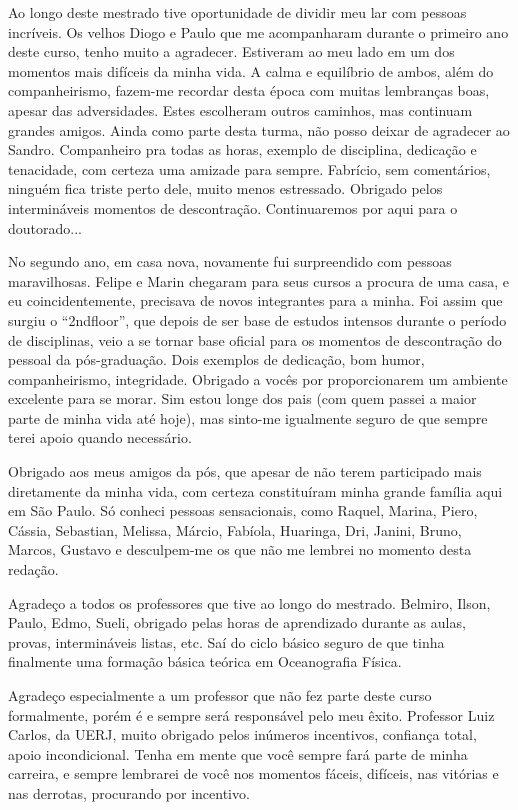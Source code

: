 Ao longo deste mestrado tive oportunidade de dividir meu lar com pessoas in\-crí\-veis. Os velhos Diogo e Paulo
que me acompanharam durante o primeiro ano deste curso, tenho muito a agradecer. Estiveram ao meu lado em
um dos momentos mais difíceis da minha vida. A calma e equilíbrio de ambos, além do companheirismo, fazem-me
recordar desta época com muitas lembranças boas, apesar das adversidades. Estes escolheram outros caminhos, mas 
continuam grandes amigos. Ainda como parte desta turma, não posso deixar de agradecer ao Sandro. Companheiro pra todas as horas,
exemplo de disciplina, dedicação e tenacidade, com certeza uma amizade para sempre. Fabrício, sem comentários, ninguém
fica triste perto dele, muito menos estressado. Obrigado pelos intermináveis momentos de descontração. 
Continuaremos por aqui para o doutorado... 
 
No segundo ano, em casa nova, novamente fui surpreendido com pessoas maravilhosas. Felipe e Marin chegaram
para seus cursos a procura de uma casa, e eu coincidentemente, precisava de novos integrantes para a minha. 
Foi assim que surgiu o ``2ndfloor'', que depois de ser base de estudos intensos durante o período de disciplinas, 
veio a se tornar base oficial para os momentos de descontração do pessoal da pós-graduação. 
Dois exemplos de dedicação, bom humor, companheirismo, integridade. Obrigado a vocês por proporcionarem
um ambiente excelente para se morar. Sim estou longe dos pais (com quem passei a maior parte de minha vida até hoje),  
mas sinto-me igualmente seguro de que sempre terei apoio quando necessário.

Obrigado aos meus amigos da pós, que 
apesar de não terem participado mais diretamente da minha vida, com certeza constituíram minha grande família
aqui em São Paulo. Só conheci pessoas sensacionais, como Raquel, Marina, Piero, Cássia, Sebastian, Melissa, Márcio, Fabíola, 
Huaringa, Dri, Janini, Bruno, Marcos, Gustavo e desculpem-me os que não me lembrei no momento desta redação.

Agradeço a todos os professores que tive ao longo do mestrado. Belmiro, Ilson, Paulo, Edmo, Sueli, obrigado
pelas horas de aprendizado durante as aulas, provas, intermináveis listas, etc. Saí do ciclo básico seguro de que
tinha finalmente uma formação básica teórica em Oceanografia Física. 

Agradeço especialmente a um professor que não fez parte deste curso formalmente, porém é e sempre será responsável 
pelo meu êxito. Professor Luiz Carlos, da UERJ, muito obrigado pelos inúmeros incentivos, confiança total, 
apoio incondicional. Tenha em mente que você sempre fará parte de minha carreira, e sempre lembrarei 
de você nos momentos fáceis, difíceis, nas vitórias e nas derrotas, procurando por incentivo.

